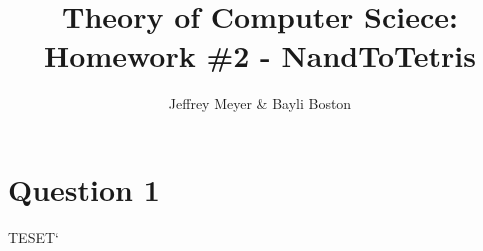 \documentclass[titlepage]{article}
\author{Jeffrey Meyer & Bayli Boston}
\title{Theory of Computer Sciece: Homework \#2 - NandToTetris}
\begin{document}
\maketitle

\newpage

\section{Question 1}

TESET`
\end{document}
